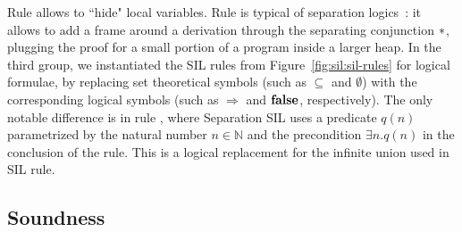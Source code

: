 Rule  allows to ``hide" local variables.
Rule  is typical of separation logics~\cite{Reynolds02,RBDDOV20}: it allows to add a frame around a derivation through the separating conjunction $*$, plugging the proof for a small portion of a program inside a larger heap.
In the third group, we instantiated the SIL rules from Figure~\ref{fig:sil:sil-rules} for logical formulae, by replacing set theoretical symbols (such as $\subseteq$ and $\emptyset$) with the corresponding logical symbols (such as $\Rightarrow$ and $\textbf{false}$, respectively). The only notable difference is in rule , where Separation SIL uses a predicate $q(n)$ parametrized by the natural number $n \in \mathbb{N}$ and the precondition $\exists n. q(n)$ in the conclusion of the rule. This is a logical replacement for the infinite union used in SIL rule.

\subsection{Soundness}


